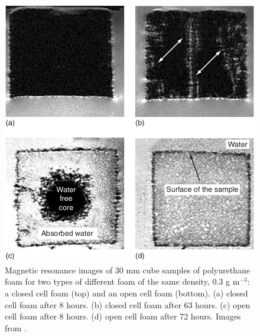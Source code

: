 \begin{figure}[!tbhp]
\includegraphics[width=\textwidth]{Figures/NeutronCaptureTime/foam_water_absorption.png}
\centering
\caption{Magnetic resonance images of 30 mm cube samples of polyurethane foam for two types of different foam of the same density, 0.3 g m${}^{-3}$: a closed cell foam (top) and an open cell foam (bottom).
(a) closed cell foam after 8 hours. (b) closed cell foam after 63 hours.
(c) open cell foam after 8 hours. (d) open cell foam after 72 hours.
Images from \cite{foam_mri_data_ref}.
}
\label{fig:foam_mri_water_ingress}
\end{figure}


